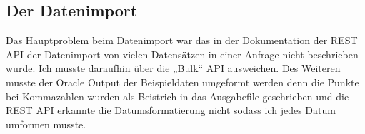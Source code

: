 \subsection{Der Datenimport}
Das Hauptproblem beim Datenimport war das in der Dokumentation der REST API der Datenimport von vielen Datensätzen in einer Anfrage nicht beschrieben wurde. Ich musste daraufhin über die „Bulk“ API ausweichen. Des Weiteren musste der Oracle Output der Beispieldaten umgeformt werden denn die Punkte bei Kommazahlen wurden als Beistrich in das Ausgabefile geschrieben und die REST API erkannte die Datumsformatierung nicht sodass ich jedes Datum umformen musste.
